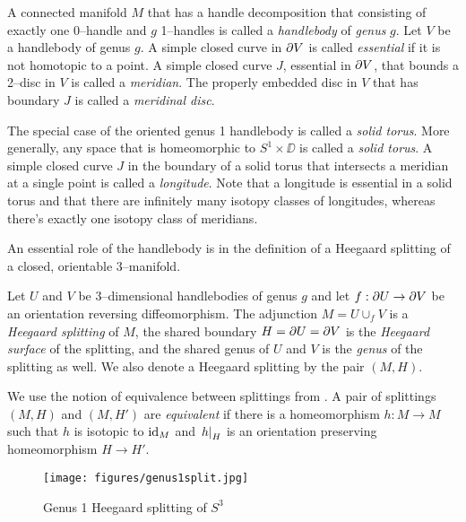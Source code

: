 \begin{defn}
	A connected manifold $M$ that has a handle decomposition that consisting of exactly one 0--handle and $g$ 1--handles is called a \emph{handlebody} of \emph{genus} $g$.
	Let $V$ be a handlebody of genus $g$.
	A simple closed curve in $\partial V$ is called \emph{essential} if it is not homotopic to a point.
	A simple closed curve $J$, essential in $\partial V$, that bounds a 2--disc in $V$ is called a \emph{meridian}.
	The properly embedded disc in $V$ that has boundary $J$ is called a \emph{meridinal disc}.
	
	The special case of the oriented genus 1 handlebody is called a \emph{solid torus}.
	More generally, any space that is homeomorphic to $S^1\times\DD$ is called a \emph{solid torus}.
	A simple closed curve $J$ in the boundary of a solid torus that intersects a meridian at a single point is called a \emph{longitude}.
	Note that a longitude is essential in a solid torus and that there are infinitely many isotopy classes of longitudes, whereas there's exactly one isotopy class of meridians.
\end{defn}

An essential role of the handlebody is in the definition of a Heegaard splitting of a closed, orientable 3--manifold.

\begin{defn}	
	Let $U$ and $V$ be 3--dimensional handlebodies of genus $g$ and let $f:\partial U\to \partial V$ be an orientation reversing diffeomorphism.
	The adjunction $M=U\cup_f V$ is a \emph{Heegaard splitting} of $M$, the shared boundary $H = \partial U = \partial V$ is the \emph{Heegaard surface} of the splitting, and the shared genus of $U$ and $V$ is the \emph{genus} of the splitting as well.
	We also denote a Heegaard splitting by the pair $(M,H)$.
	
	We use the notion of equivalence between splittings from \cite{SchlWald}.
	A pair of splittings $(M,H)$ and $(M,H')$ are \emph{equivalent} if there is a homeomorphism $h:M\to M$ such that $h$ is isotopic to $\textrm{id}_{M}$ and $\left.h\right|_{H}$ is an orientation preserving homeomorphism $H\to H'$.
\end{defn}

\begin{figure}
		\centering
		\caption{Genus 1 Heegaard splitting of $S^3$}
		\texttt{[image: figures/genus1split.jpg]}
		\label{fig:genus1split}
\end{figure}

